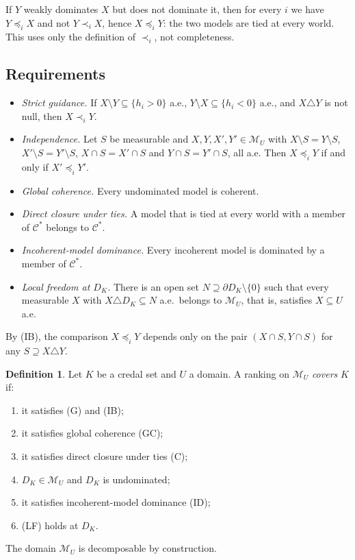 \documentclass[11pt]{article}
\newcommand{\M}{\mathcal{M}}
\theoremstyle{plain}
\theoremstyle{definition}
\newtheorem{definition}[theorem]{Definition}
\theoremstyle{remark}
\begin{document}
If $Y$ weakly dominates $X$ but does not dominate it, then for every $i$ we have
$Y\preceq_iX$ and not $Y\prec_iX$, hence $X\preceq_iY$: the two models are tied at every
world. This uses only the definition of $\prec_i$, not completeness.

\subsection{Requirements}

\begin{itemize}
  \item[(G)] \emph{Strict guidance.} If $X\setminus Y\subseteq\{h_i>0\}$ a.e.,
  $Y\setminus X\subseteq\{h_i<0\}$ a.e., and $X\triangle Y$ is not null, then
  $X\prec_iY$.
  \item[(IB)] \emph{Independence.} Let $S$ be measurable and $X,Y,X',Y'\in\M_U$ with
  $X\setminus S=Y\setminus S$, $X'\setminus S=Y'\setminus S$, $X\cap S=X'\cap S$ and
  $Y\cap S=Y'\cap S$, all a.e. Then $X\preceq_iY$ if and only if $X'\preceq_iY'$.
  \item[(GC)] \emph{Global coherence.} Every undominated model is coherent.
  \item[(C)] \emph{Direct closure under ties.} A model that is tied at every world with a
  member of $\mathcal C^\ast$ belongs to $\mathcal C^\ast$.
  \item[(ID)] \emph{Incoherent-model dominance.} Every incoherent model is dominated by a
  member of $\mathcal C^\ast$.
  \item[(LF)] \emph{Local freedom at $D_K$.} There is an open set $N\supseteq\partial
  D_K\setminus\{0\}$ such that every measurable $X$ with $X\triangle D_K\subseteq N$ a.e.\
  belongs to $\M_U$, that is, satisfies $X\subseteq U$ a.e.
\end{itemize}
By (IB), the comparison $X\preceq_iY$ depends only on the pair $(X\cap S,Y\cap S)$ for any
$S\supseteq X\triangle Y$.

\begin{definition}\label{def:cover}
Let $K$ be a credal set and $U$ a domain. A ranking on $\M_U$ \emph{covers} $K$ if:
\begin{enumerate}[label=(\roman*)]
  \item it satisfies (G) and (IB);
  \item it satisfies global coherence (GC);
  \item it satisfies direct closure under ties (C);
  \item $D_K\in\M_U$ and $D_K$ is undominated;
  \item it satisfies incoherent-model dominance (ID);
  \item (LF) holds at $D_K$.
\end{enumerate}
The domain $\M_U$ is decomposable by construction.
\end{definition}
\end{document}
